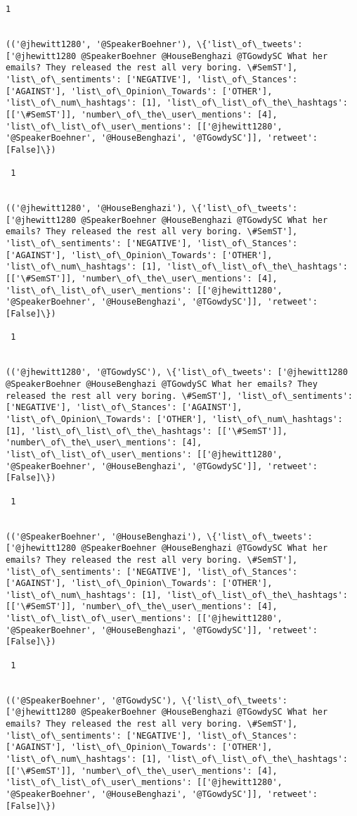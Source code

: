 \documentclass[11pt]{article}
\begin{document}
\begin{Verbatim}[commandchars=\\\{\}]
 1
 

(('@jhewitt1280', '@SpeakerBoehner'), \{'list\_of\_tweets': ['@jhewitt1280 @SpeakerBoehner @HouseBenghazi @TGowdySC What her emails? They released the rest all very boring. \#SemST'], 'list\_of\_sentiments': ['NEGATIVE'], 'list\_of\_Stances': ['AGAINST'], 'list\_of\_Opinion\_Towards': ['OTHER'], 'list\_of\_num\_hashtags': [1], 'list\_of\_list\_of\_the\_hashtags': [['\#SemST']], 'number\_of\_the\_user\_mentions': [4], 'list\_of\_list\_of\_user\_mentions': [['@jhewitt1280', '@SpeakerBoehner', '@HouseBenghazi', '@TGowdySC']], 'retweet': [False]\})

 1
 

(('@jhewitt1280', '@HouseBenghazi'), \{'list\_of\_tweets': ['@jhewitt1280 @SpeakerBoehner @HouseBenghazi @TGowdySC What her emails? They released the rest all very boring. \#SemST'], 'list\_of\_sentiments': ['NEGATIVE'], 'list\_of\_Stances': ['AGAINST'], 'list\_of\_Opinion\_Towards': ['OTHER'], 'list\_of\_num\_hashtags': [1], 'list\_of\_list\_of\_the\_hashtags': [['\#SemST']], 'number\_of\_the\_user\_mentions': [4], 'list\_of\_list\_of\_user\_mentions': [['@jhewitt1280', '@SpeakerBoehner', '@HouseBenghazi', '@TGowdySC']], 'retweet': [False]\})

 1
 

(('@jhewitt1280', '@TGowdySC'), \{'list\_of\_tweets': ['@jhewitt1280 @SpeakerBoehner @HouseBenghazi @TGowdySC What her emails? They released the rest all very boring. \#SemST'], 'list\_of\_sentiments': ['NEGATIVE'], 'list\_of\_Stances': ['AGAINST'], 'list\_of\_Opinion\_Towards': ['OTHER'], 'list\_of\_num\_hashtags': [1], 'list\_of\_list\_of\_the\_hashtags': [['\#SemST']], 'number\_of\_the\_user\_mentions': [4], 'list\_of\_list\_of\_user\_mentions': [['@jhewitt1280', '@SpeakerBoehner', '@HouseBenghazi', '@TGowdySC']], 'retweet': [False]\})

 1
 

(('@SpeakerBoehner', '@HouseBenghazi'), \{'list\_of\_tweets': ['@jhewitt1280 @SpeakerBoehner @HouseBenghazi @TGowdySC What her emails? They released the rest all very boring. \#SemST'], 'list\_of\_sentiments': ['NEGATIVE'], 'list\_of\_Stances': ['AGAINST'], 'list\_of\_Opinion\_Towards': ['OTHER'], 'list\_of\_num\_hashtags': [1], 'list\_of\_list\_of\_the\_hashtags': [['\#SemST']], 'number\_of\_the\_user\_mentions': [4], 'list\_of\_list\_of\_user\_mentions': [['@jhewitt1280', '@SpeakerBoehner', '@HouseBenghazi', '@TGowdySC']], 'retweet': [False]\})

 1
 

(('@SpeakerBoehner', '@TGowdySC'), \{'list\_of\_tweets': ['@jhewitt1280 @SpeakerBoehner @HouseBenghazi @TGowdySC What her emails? They released the rest all very boring. \#SemST'], 'list\_of\_sentiments': ['NEGATIVE'], 'list\_of\_Stances': ['AGAINST'], 'list\_of\_Opinion\_Towards': ['OTHER'], 'list\_of\_num\_hashtags': [1], 'list\_of\_list\_of\_the\_hashtags': [['\#SemST']], 'number\_of\_the\_user\_mentions': [4], 'list\_of\_list\_of\_user\_mentions': [['@jhewitt1280', '@SpeakerBoehner', '@HouseBenghazi', '@TGowdySC']], 'retweet': [False]\})


\end{Verbatim}
\end{document}
